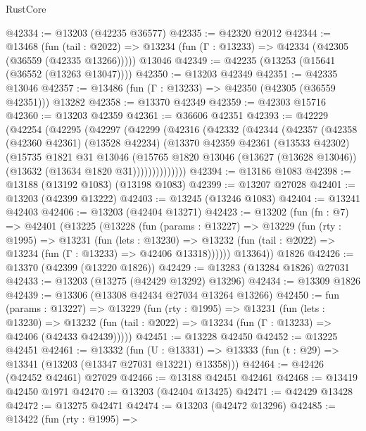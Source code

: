 \begin{lexlean}{RustCore}
\begin{coremodule}
@42334 := @13203 (@42235 @36577)
@42335 := @42320 @2012
@42344 := @13468
    (fun (tail : @2022) => @13234 (fun (Γ : @13233) => @42334 (@42305 (@36559 (@42335 @13266)))))
    @13046
@42349 := @42235 (@13253 (@15641 (@36552 (@13263 @13047))))
@42350 := @13203 @42349
@42351 := @42335 @13046
@42357 := @13486 (fun (Γ : @13233) => @42350 (@42305 (@36559 @42351))) @13282
@42358 := @13370 @42349
@42359 := @42303 @15716
@42360 := @13203 @42359
@42361 := @36606 @42351
@42393 := @42229
    (@42254
      (@42295
        (@42297
          (@42299
            (@42316
              (@42332
                (@42344
                  (@42357
                    (@42358
                      (@42360 @42361)
                      (@13528 @42234)
                      (@13370
                        @42359
                        @42361
                        (@13533 @42302)
                        (@15735
                          @1821
                          @31
                          @13046
                          (@15765
                            @1820
                            @13046
                            (@13627 (@13628 @13046))
                            (@13632 (@13634 @1820 @31))))))))))))))
@42394 := @13186 @1083
@42398 := @13188 (@13192 @1083) (@13198 @1083)
@42399 := @13207 @27028
@42401 := @13203 (@42399 @13222)
@42403 := @13245 (@13246 @1083)
@42404 := @13241 @42403
@42406 := @13203 (@42404 @13271)
@42423 := @13202
    (fun (fn : @7) =>
    @42401
      (@13225
        (@13228
          (fun (params : @13227) =>
          @13229
            (fun (rty : @1995) =>
            @13231
              (fun (lets : @13230) =>
              @13232 (fun (tail : @2022) => @13234 (fun (Γ : @13233) => @42406 @13318))))))
        @13364))
    @1826
@42426 := @13370 (@42399 (@13220 @1826))
@42429 := @13283 (@13284 @1826) @27031
@42433 := @13203 (@13275 (@42429 @13292) @13296)
@42434 := @13309 @1826
@42439 := @13306 (@13308 @42434 @27034 @13264 @13266)
@42450 := fun (params : @13227) =>
  @13229
    (fun (rty : @1995) =>
    @13231
      (fun (lets : @13230) =>
      @13232 (fun (tail : @2022) => @13234 (fun (Γ : @13233) => @42406 (@42433 @42439)))))
@42451 := @13228 @42450
@42452 := @13225 @42451
@42461 := @13332
    (fun (U : @13331) => @13333 (fun (t : @29) => @13341 (@13203 (@13347 @27031 @13221) @13358)))
@42464 := @42426 (@42452 @42461) @27029
@42466 := @13188 @42451 @42461
@42468 := @13419 @42450 @1971
@42470 := @13203 (@42404 @13425)
@42471 := @42429 @13428
@42472 := @13275 @42471
@42474 := @13203 (@42472 @13296)
@42485 := @13422
    (fun (rty : @1995) =>

\end{coremodule}
\end{lexlean}
